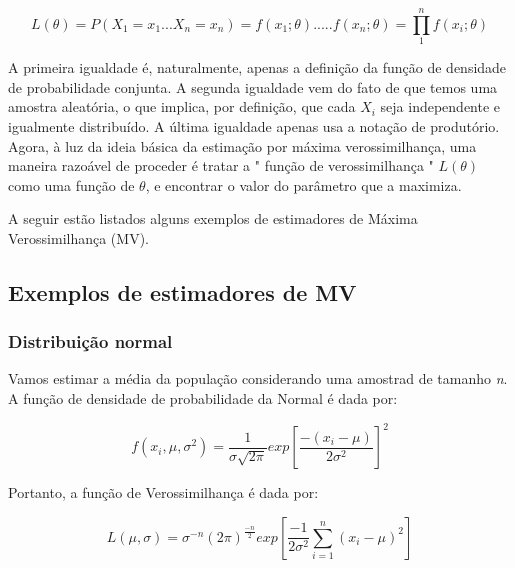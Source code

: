 \begin{equation}
L(\theta) = P (X_{1} = x_{1} ... X_{n} = x_{n}) =  f(x_{1}; \theta) . ... .f(x_{n}; \theta) =  \prod_{1}^{n} f(x_{i}; \theta)
\end{equation}

A primeira igualdade é, naturalmente, apenas a definição da função de densidade de probabilidade conjunta. A segunda igualdade vem do fato de que temos uma amostra aleatória, o que implica, por definição, que cada  \begin{math} X_{i} \end{math} seja independente e igualmente distribuído. A última igualdade apenas usa a notação de produtório. Agora, à luz da ideia básica da estimação por máxima verossimilhança, uma maneira razoável de proceder é tratar a " função de verossimilhança "  \begin{math} L (\theta) \end{math} como uma função de \begin{math} \theta \end{math}, e encontrar o valor do parâmetro que a maximiza.

A seguir estão listados alguns exemplos de estimadores de Máxima Verossimilhança (MV).

\subsection{Exemplos de estimadores de MV}

\subsubsection{Distribuição normal}

Vamos estimar a média da população considerando uma amostrad de tamanho \emph{n}. A função de densidade de probabilidade da Normal é dada por:

\begin{equation}
f(x_{i}, \mu, \sigma^{2}) = \frac{1}{\sigma\sqrt{2\pi}}exp\left [ \frac{-(x_{i} - \mu)}{2\sigma^{2}} \right ]^{2}
\end{equation}

Portanto, a função de Verossimilhança é dada por:

\begin{equation}
L(\mu, \sigma) = \sigma^{-n}(2\pi)^{\frac{-n}{2}}exp\left [  \frac{-1}{2\sigma^2}\sum_{i=1}^{n}(x_{i}-\mu)^{2} \right ]
\end{equation}

